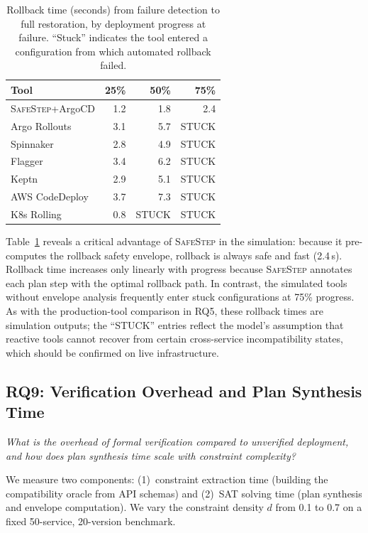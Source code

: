 \documentclass[10pt,twocolumn]{article}
\newcommand{\safestep}{\textsc{SafeStep}}
\begin{document}
\begin{table}[t]
\centering
\caption{Rollback time (seconds) from failure detection to
  full restoration, by deployment progress at failure.
  ``Stuck'' indicates the tool entered a configuration
  from which automated rollback failed.}
\label{tab:rollback-time}
\small
\begin{tabular}{@{}lrrr@{}}
\toprule
Tool & 25\% & 50\% & 75\% \\
\midrule
\safestep{}+ArgoCD & 1.2 & 1.8 & 2.4 \\
Argo Rollouts      & 3.1 & 5.7 & STUCK \\
Spinnaker          & 2.8 & 4.9 & STUCK \\
Flagger            & 3.4 & 6.2 & STUCK \\
Keptn              & 2.9 & 5.1 & STUCK \\
AWS CodeDeploy     & 3.7 & 7.3 & STUCK \\
K8s Rolling        & 0.8 & STUCK & STUCK \\
\bottomrule
\end{tabular}
\end{table}

Table~\ref{tab:rollback-time} reveals a critical advantage
of \safestep{} in the simulation: because it pre-computes the rollback safety
envelope, rollback is always safe and fast (2.4\,s).
Rollback time increases only linearly with progress because
\safestep{} annotates each plan step with the optimal
rollback path. In contrast, the simulated tools without envelope analysis
frequently enter stuck configurations at 75\% progress.
As with the production-tool comparison in RQ5, these rollback
times are simulation outputs; the ``STUCK'' entries reflect
the model's assumption that reactive tools cannot recover from
certain cross-service incompatibility states, which should be
confirmed on live infrastructure.

\subsection{RQ9: Verification Overhead and Plan Synthesis Time}

\emph{What is the overhead of formal verification compared
to unverified deployment, and how does plan synthesis time
scale with constraint complexity?}

We measure two components: (1)~constraint extraction time
(building the compatibility oracle from API schemas) and
(2)~SAT solving time (plan synthesis and envelope
computation). We vary the constraint density $d$ from
0.1 to 0.7 on a fixed 50-service, 20-version benchmark.
\end{document}
